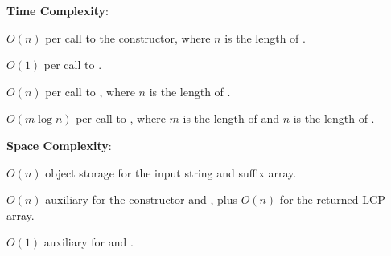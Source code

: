 \textbf{Time Complexity}:
\begin{compactitem}
  \item $O(n)$ per call to the constructor, where $n$ is the length of .
  \item $O(1)$ per call to .
  \item $O(n)$ per call to , where $n$ is the length of .
  \item $O(m \log n)$ per call to , where $m$ is the length of  and $n$ is the length of .
\end{compactitem}

\textbf{Space Complexity}:
\begin{compactitem}
  \item $O(n)$ object storage for the input string and suffix array.
  \item $O(n)$ auxiliary for the constructor and , plus $O(n)$ for the returned LCP array.
  \item $O(1)$ auxiliary for  and .
\end{compactitem}

